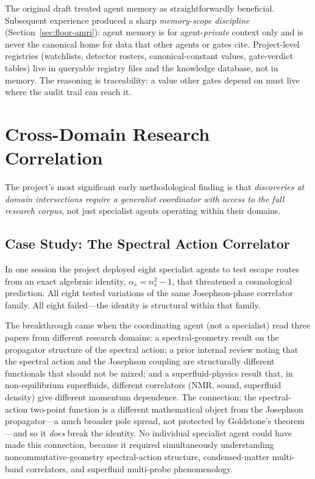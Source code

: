 \documentclass[12pt,a4paper]{article}
\begin{document}
The original draft treated agent memory as straightforwardly beneficial. Subsequent experience produced a sharp \emph{memory-scope discipline} (Section~\ref{sec:floor-amri}): agent memory is for agent-\emph{private} context only and is never the canonical home for data that other agents or gates cite. Project-level registries (watchlists, detector rosters, canonical-constant values, gate-verdict tables) live in queryable registry files and the knowledge database, not in memory. The reasoning is traceability: a value other gates depend on must live where the audit trail can reach it.

\section{Cross-Domain Research Correlation}
\label{sec:crossdomain}

The project's most significant early methodological finding is that \emph{discoveries at domain intersections require a generalist coordinator with access to the full research corpus}, not just specialist agents operating within their domains.

\subsection{Case Study: The Spectral Action Correlator}
\label{sec:sacase}

In one session the project deployed eight specialist agents to test escape routes from an exact algebraic identity, $\alpha_s = n_s^2 - 1$, that threatened a cosmological prediction. All eight tested variations of the same Josephson-phase correlator family. All eight failed---the identity is structural within that family.

The breakthrough came when the coordinating agent (not a specialist) read three papers from different research domains: a spectral-geometry result on the propagator structure of the spectral action; a prior internal review noting that the spectral action and the Josephson coupling are structurally different functionals that should not be mixed; and a superfluid-physics result that, in non-equilibrium superfluids, different correlators (NMR, sound, superfluid density) give different momentum dependence. The connection: the spectral-action two-point function is a different mathematical object from the Josephson propagator---a much broader pole spread, not protected by Goldstone's theorem---and so it \emph{does} break the identity. No individual specialist agent could have made this connection, because it required simultaneously understanding noncommutative-geometry spectral-action structure, condensed-matter multi-band correlators, and superfluid multi-probe phenomenology.
\end{document}
